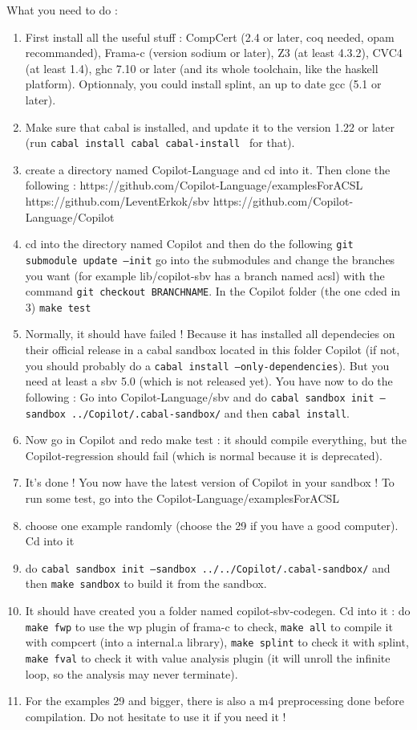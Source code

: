 \documentclass[11pt]{article}
\begin{document}
What you need to do : 
\begin{enumerate}
\item First install all the useful stuff : CompCert (2.4 or later, coq needed, opam recommanded), Frama-c (version sodium or later), Z3 (at least 4.3.2), CVC4 (at least 1.4), ghc 7.10 or later (and its whole toolchain, like the haskell platform).
\subitem Optionnaly, you could install splint, an up to date gcc (5.1 or later).
\item Make sure that cabal is installed, and update it to the version 1.22 or later (run \texttt{cabal install cabal cabal-install } for that). 
\item create a directory named Copilot-Language and cd into it. Then clone the following :
\subitem https://github.com/Copilot-Language/examplesForACSL
\subitem https://github.com/LeventErkok/sbv
\subitem https://github.com/Copilot-Language/Copilot
\item cd into the directory named Copilot and then do the following
\subitem \texttt{git submodule update --init}
\subitem go into the submodules and change the branches you want (for example lib/copilot-sbv has a branch named acsl) with the command \texttt{git checkout BRANCHNAME}. 
\subitem In the Copilot folder (the one cded in 3) \texttt{make test}
\item Normally, it should have failed ! Because it has installed all dependecies on their official release in a cabal sandbox located in this folder Copilot (if not, you should probably do a \texttt{cabal install --only-dependencies}). But you need at least a sbv 5.0 (which is not released yet). You have now to do the following :
\subitem Go into Copilot-Language/sbv and do \texttt{cabal sandbox init --sandbox ../Copilot/.cabal-sandbox/} and then \texttt{cabal install}.
\item Now go in Copilot and redo make test : it should compile everything, but the Copilot-regression should fail (which is normal because it is deprecated).
\item It's done ! You now have the latest version of Copilot in your sandbox ! To run some test, go into the Copilot-Language/examplesForACSL
\item choose one example randomly (choose the 29 if you have a good computer). Cd into it
\item do \texttt{cabal sandbox init --sandbox ../../Copilot/.cabal-sandbox/} and then \texttt{make sandbox} to build it from the sandbox.
\item It should have created you a folder named copilot-sbv-codegen. Cd into it :
\subitem do \texttt{make fwp} to use the wp plugin of frama-c to check, \texttt{make all} to compile it with compcert (into a internal.a library), \texttt{make splint} to check it with splint, \texttt{make fval} to check it with value analysis plugin (it will unroll the infinite loop, so the analysis may never terminate).
\item For the examples 29 and bigger, there is also a m4 preprocessing done before compilation. Do not hesitate to use it if you need it !
\end{enumerate}
\end{document}
